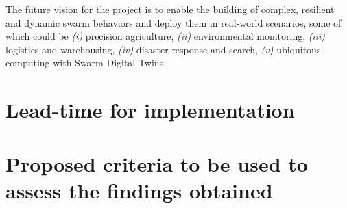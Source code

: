 \documentclass[12pt]{article}
\begin{document}
The future vision for the project is to enable the building of complex, resilient and dynamic swarm behaviors and deploy them in real-world scenarios, some of which could be \textit{(i)} precision agriculture,
\textit{(ii)} environmental monitoring, \textit{(iii)} logistics and warehousing, \textit{(iv)} disaster response and search, 
\textit{(v)} ubiquitous computing with Swarm Digital Twins.

\section{Lead-time for implementation}

\section{Proposed criteria to be used to assess the findings obtained}

\clearpage

\renewcommand{\refname}{References}



\end{document}
